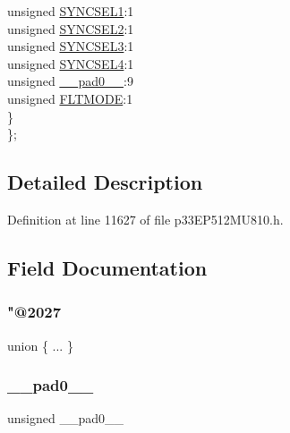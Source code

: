 \begin{DoxyCompactItemize}
\begin{tabbing}
\>\>unsigned \hyperlink{structtag_o_c8_c_o_n2_b_i_t_s_a50e73f95ab1c258ddc64f69c0991deaf}{SYNCSEL1}:1\\
\>\>unsigned \hyperlink{structtag_o_c8_c_o_n2_b_i_t_s_a304907a5d2c4cbf1114a54642a85951e}{SYNCSEL2}:1\\
\>\>unsigned \hyperlink{structtag_o_c8_c_o_n2_b_i_t_s_a6bbd1bd2ead6c9fa713969c6eb0f0c75}{SYNCSEL3}:1\\
\>\>unsigned \hyperlink{structtag_o_c8_c_o_n2_b_i_t_s_a0cd5bbe196c7974953909d27a6307bb7}{SYNCSEL4}:1\\
\>\>unsigned \hyperlink{structtag_o_c8_c_o_n2_b_i_t_s_adf71f3d8410c1f1dbbc96680a92c49af}{\_\_pad0\_\_}:9\\
\>\>unsigned \hyperlink{structtag_o_c8_c_o_n2_b_i_t_s_ad53c2a5303780172219bfd5e0100c782}{FLTMODE}:1\\
\>\} \\
\}; \\

\end{tabbing}\end{DoxyCompactItemize}


\subsection{Detailed Description}


Definition at line 11627 of file p33\+E\+P512\+M\+U810.\+h.



\subsection{Field Documentation}
\mbox{\label{structtag_o_c8_c_o_n2_b_i_t_s_a5b23b2b137650ee07f9dd5613d371034}} 
\subsubsection{\texorpdfstring{"@2027}{@2027}}
{\footnotesize\ttfamily union \{ ... \} }

\mbox{\label{structtag_o_c8_c_o_n2_b_i_t_s_adf71f3d8410c1f1dbbc96680a92c49af}} 
\subsubsection{\texorpdfstring{\+\_\+\+\_\+pad0\+\_\+\+\_\+}{\_\_pad0\_\_}}
{\footnotesize\ttfamily unsigned \+\_\+\+\_\+pad0\+\_\+\+\_\+}



